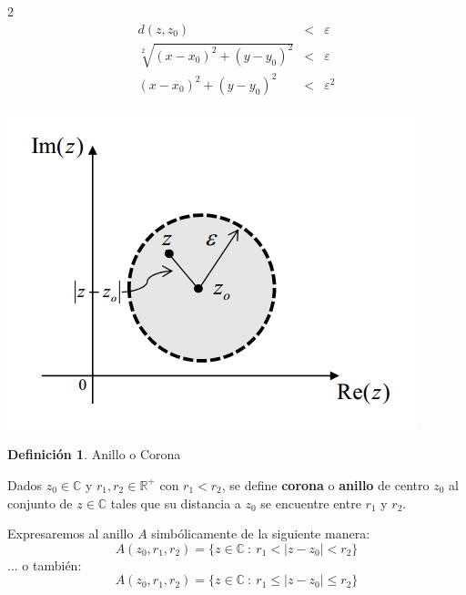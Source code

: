 \documentclass[12pt]{article}
\theoremstyle{definition}
\newtheorem{definition}{Definici\'on}[section]
\begin{document}
\begin{multicols} {2}
\begin{eqnarray*}
d(z, z_0) &<& \varepsilon\\
\sqrt[2]{(x-x_0)^2 + (y-y_0)^2} &<& \varepsilon\\
(x-x_0)^2 + (y-y_0)^2 &<& \varepsilon^2\\
\end{eqnarray*}


\begin{center}
	\includegraphics[scale=0.7]{entorno.png}
\end{center}
\end{multicols}

\colorbox{red!40!white!80}{\parbox{\linewidth}{
\theoremstyle{definition}
\begin{definition} Anillo o Corona

Dados $z_0 \in \mathbb{C}$ y $r_1, r_2 \in \mathbb{R}^+$ con $r_1<r_2$, se define \textbf{corona} o \textbf{anillo} de centro $z_0$ al conjunto de $z \in \mathbb{C}$ tales que su distancia a $z_0$ se encuentre entre $r_1$ y $r_2$.

Expresaremos al anillo $A$ simb\'olicamente de la siguiente manera:
$$ A(z_0,r_1, r_2) = \{ z \in \mathbb{C}\ :\ r_1 < |z-z_0| < r_2 \} $$
... o tambi\'en:
$$ A(z_0,r_1, r_2) = \{ z \in \mathbb{C}\ :\ r_1 \leq |z-z_0| \leq r_2 \} $$
\end{definition}}}
\end{document}
